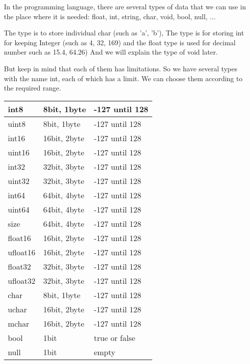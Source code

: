 \documentclass[11pt,fleqn]{book}
\begin{document}
In the programming language, there are several types of data that we can use in the place where it is needed:
float, int, string, char, void, bool, null, ...

The type is to store individual char (such as 'a', 'b'), The type is for storing int for keeping Integer (such as 4, 32, 169) and the float type is used for decimal number such as 15.4, 64.26) And we will explain the type of void later.

But keep in mind that each of them has limitations.
So we have several types with the name int, each of which has a limit.
We can choose them according to the required range.

\pagebreak


\begin{table}[]
    \centering
    \begin{tabular}{|l|l|l|}
        \hline
        int8 & 8bit, 1byte & -127 until 128   \\ \hline
        uint8 & 8bit, 1byte & -127 until 128   \\ \hline

        int16 & 16bit, 2byte & -127 until 128   \\ \hline
        uint16 & 16bit, 2byte & -127 until 128   \\ \hline

        int32 & 32bit, 3byte & -127 until 128   \\ \hline
        uint32 & 32bit, 3byte & -127 until 128   \\ \hline

        int64 & 64bit, 4byte & -127 until 128   \\ \hline
        uint64 & 64bit, 4byte & -127 until 128   \\ \hline

        size & 64bit, 4byte & -127 until 128   \\ \hline

        float16 & 16bit, 2byte & -127 until 128   \\ \hline
        ufloat16 & 16bit, 2byte & -127 until 128   \\ \hline

        float32 & 32bit, 3byte & -127 until 128   \\ \hline
        ufloat32 & 32bit, 3byte & -127 until 128   \\ \hline

        char & 8bit, 1byte & -127 until 128   \\ \hline
        uchar & 16bit, 2byte & -127 until 128   \\ \hline

        mchar & 16bit, 2byte & -127 until 128   \\ \hline

        bool & 1bit & true or false \\ \hline
        null & 1bit & empty \\ \hline

    \end{tabular}
\end{table}
\label{List of data type(s)}
\end{document}
